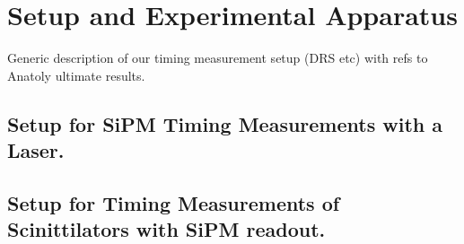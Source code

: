 \section{Setup and Experimental Apparatus }
\label{sec:setup}

Generic description of our timing measurement setup (DRS etc) with refs to Anatoly ultimate results.

\subsection{Setup for SiPM Timing Measurements with a Laser.}


\subsection{Setup for Timing Measurements of Scinittilators with SiPM readout.}
